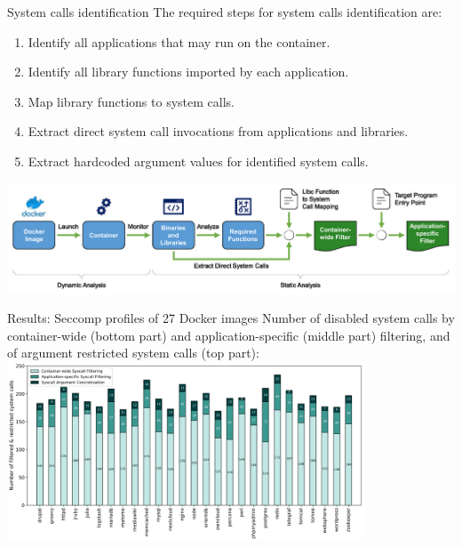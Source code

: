 \documentclass{beamer}
\begin{document}
\begin{frame}{System calls identification}
The required steps for system calls identification are:
\begin{enumerate}
    \item Identify all applications that may run on the container.
    \item Identify all library functions imported by each application.
    \item Map library functions to system calls.
    \item Extract direct system call invocations from applications and libraries.
    \item Extract hardcoded argument values for identified system calls.
\end{enumerate}
\includegraphics[width=1\textwidth]
{assets/Confine/Confine-design.PNG}
\end{frame}

\begin{frame}{Results: Seccomp profiles of 27 Docker images}
Number of disabled system calls by container-wide (bottom part) and
application-specific (middle part) filtering, and of argument restricted system calls (top part):
\hspace*{1cm}
\includegraphics[width=0.8\textwidth]
{assets/Confine/Confine-filter.PNG}
\end{frame}
\end{document}
